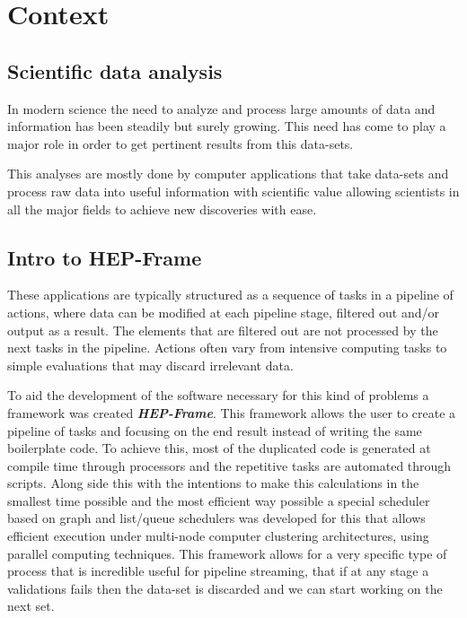
\section{ Context}


\subsection{Scientific data analysis}
In modern science the need to analyze and process large amounts of data and information has been steadily but surely growing. This need has come to play a major role in order to get pertinent results from this data-sets.
\par This analyses are mostly done by computer applications that take data-sets and process raw data into useful information with scientific value allowing scientists in all the major fields to achieve new discoveries with ease.

\subsection{Intro to HEP-Frame}
These applications are typically structured as a sequence of tasks in a pipeline of actions, where data can be modified at each pipeline stage, filtered out and/or output as a result. The elements that are filtered out are not processed by the next tasks in the pipeline. Actions often vary from intensive computing tasks to simple evaluations that may discard irrelevant data.
\par To aid the development of the software necessary for this kind of problems a framework  was created \textit{\textbf{HEP-Frame}}. This framework allows the user to create a pipeline of tasks and focusing on the end result instead of writing the same boilerplate code. To achieve this, most of the duplicated code is generated at compile time through processors and the repetitive tasks are automated through scripts. Along side this with the intentions to make this calculations in the smallest time possible and the most efficient way possible a special scheduler based on graph and list/queue schedulers was developed for this that allows efficient execution under multi-node computer clustering architectures, using parallel computing techniques.
This framework allows for a very specific type of process that is incredible useful for pipeline streaming, that if at any stage a validations fails then the data-set is discarded and we can start working on the next set.





